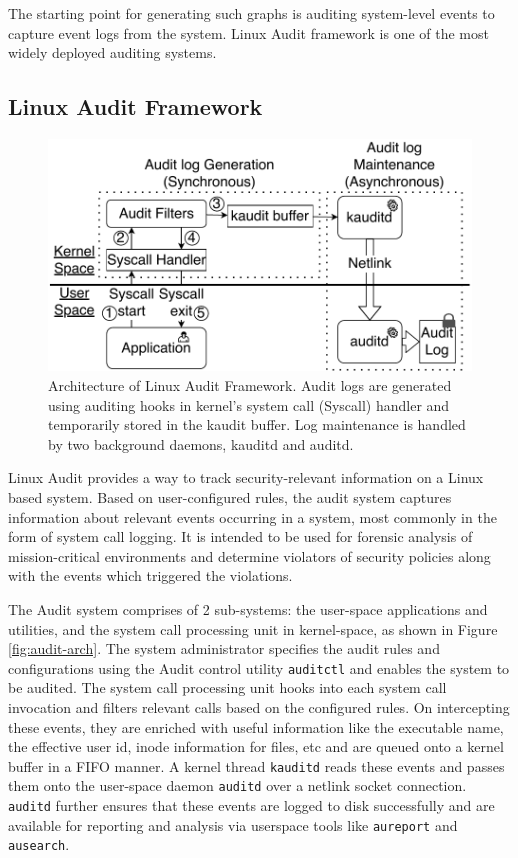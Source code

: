 The starting point for generating such graphs is auditing system-level events to capture event logs from the system. Linux Audit framework \cite{audit} is one of the most widely deployed auditing systems.

\subsection{Linux Audit Framework}
\begin{figure}[tbp]
    \centering
    \includegraphics[width=\linewidth]{fig/audit_arch_2.pdf}
    \caption{\label{fig:audit_arch} Architecture of Linux Audit Framework. Audit logs are generated using auditing hooks in kernel's system call (Syscall) handler and temporarily stored in the kaudit buffer. Log maintenance is handled by two background daemons, kauditd and auditd.}
  \end{figure}

Linux Audit provides a way to track security-relevant information on a Linux based system. Based on user-configured rules, the audit system captures information about relevant events occurring in a system, most commonly in the form of system call logging. It is intended to be used for forensic analysis of mission-critical environments and determine violators of security policies along with the events which triggered the violations. \cite{audit}

The Audit system comprises of 2 sub-systems: the user-space applications and utilities, and the system call processing unit in kernel-space, as shown in Figure \ref{fig:audit-arch}. The system administrator specifies the audit rules and configurations using the Audit control utility \texttt{auditctl} and enables the system to be audited. The system call processing unit hooks into each system call invocation and filters relevant calls based on the configured rules. On intercepting these events, they are enriched with useful information like the executable name, the effective user id, inode information for files, etc and are queued onto a kernel buffer in a FIFO manner. A kernel thread \texttt{kauditd} reads these events and passes them onto the user-space daemon \texttt{auditd} over a netlink socket connection. \texttt{auditd} further ensures that these events are logged to disk successfully and are available for reporting and analysis via userspace tools like \texttt{aureport} and \texttt{ausearch}.
